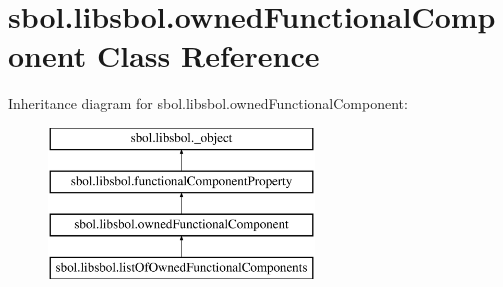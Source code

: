 \hypertarget{classsbol_1_1libsbol_1_1owned_functional_component}{}\section{sbol.\+libsbol.\+owned\+Functional\+Component Class Reference}
\label{classsbol_1_1libsbol_1_1owned_functional_component}
Inheritance diagram for sbol.\+libsbol.\+owned\+Functional\+Component\+:\begin{figure}[H]
\begin{center}
\leavevmode
\includegraphics[height=4.000000cm]{classsbol_1_1libsbol_1_1owned_functional_component}
\end{center}
\end{figure}
